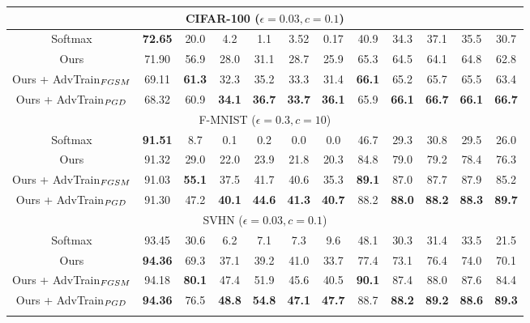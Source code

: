 \documentclass[10pt,twocolumn,letterpaper]{article}
\begin{document}
\begin{table*}[htp]
\begin{center}
{\begin{tabular}{cc|ccccc|ccccc}
\multicolumn{12}{c}{CIFAR-100 ($\epsilon = 0.03 , c = 0.1$)} \\
\hline
Softmax & \textbf{72.65} &  20.0 & 4.2 & 1.1 & 3.52& 0.17 &  40.9 & 34.3 & 37.1 & 35.5& 30.7\\
Ours & 71.90 & 56.9 & 28.0& 31.1 & 28.7 & 25.9 & 65.3 & 64.5 & 64.1 & 64.8 & 62.8 \\
Ours + AdvTrain$_{\tiny{FGSM}}$ & 69.11& \textbf{61.3} & 32.3 & 35.2 & 33.3 & 31.4 & \textbf{66.1} & 65.2 & 65.7  & 65.5  & 63.4\\
Ours + AdvTrain$_{\tiny{PGD}}$ & 68.32 & 60.9 & \textbf{34.1} & \textbf{36.7}& \textbf{33.7} & \textbf{36.1} & 65.9 & \textbf{66.1} & \textbf{66.7} & \textbf{66.1}& \textbf{66.7}\\
\hline \hline

\multicolumn{12}{c}{F-MNIST ($\epsilon = 0.3 , c = 10$)} \\
\hline
Softmax & \textbf{91.51} & 8.7 & 0.1 & 0.2 & 0.0 & 0.0 & 46.7 & 29.3 & 30.8 & 29.5 & 26.0\\
Ours & 91.32 & 29.0 & 22.0 & 23.9 & 21.8 & 20.3 & 84.8 & 79.0 & 79.2 & 78.4 & 76.3\\
Ours + AdvTrain$_{\tiny{FGSM}}$ & 91.03 & \textbf{55.1} & 37.5 & 41.7 & 40.6 & 35.3 & \textbf{89.1} & 87.0 & 87.7 & 87.9 & 85.2\\
Ours + AdvTrain$_{\tiny{PGD}}$ & 91.30 & 47.2 & \textbf{40.1} & \textbf{44.6} & \textbf{41.3}& \textbf{40.7} & 88.2 & \textbf{88.0} & \textbf{88.2} & \textbf{88.3}& \textbf{89.7}\\
\hline \hline

\multicolumn{12}{c}{SVHN ($\epsilon = 0.03 , c = 0.1$)} \\
\hline
Softmax & 93.45 & 30.6 & 6.2 & 7.1 & 7.3 & 9.6 & 48.1 & 30.3 & 31.4 & 33.5 & 21.5\\
Ours & \textbf{94.36} & 69.3 & 37.1 & 39.2 & 41.0 & 33.7 & 77.4 & 73.1 & 76.4 & 74.0 & 70.1\\
Ours + AdvTrain$_{\tiny{FGSM}}$ & 94.18 & \textbf{80.1} & 47.4 & 51.9 & 45.6 & 40.5 & \textbf{90.1} & 87.4 & 88.0 & 87.6 & 84.4\\
Ours + AdvTrain$_{\tiny{PGD}}$ & \textbf{94.36} & 76.5 & \textbf{48.8} & \textbf{54.8} & \textbf{47.1} & \textbf{47.7} & 88.7 & \textbf{88.2} & \textbf{89.2} & \textbf{88.6} & \textbf{89.3}\\
\hline \hline
\vspace{-2em}
\end{tabular} 
}
\end{center}
\vspace{-1em}
\end{table*}
\end{document}
